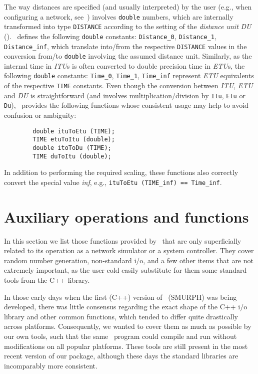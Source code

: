 The way distances are specified (and usually interpreted)
by the user (e.g., when configuring a network,
see~) involves {\tt double} numbers, which are internally
transformed into type {\tt DISTANCE} according to the setting of the
{\em distance unit\/} {\em DU\/} ().
\smurph\ defines the following {\tt double} constants:
{\tt Distance\_0},
{\tt Distance\_1},
{\tt Distance\_inf},
which translate into/from the respective {\tt DISTANCE} values in the
conversion from/to {\tt double} involving the assumed distance unit.
Similarly, as the internal time in {\em ITU\/}s is often converted to 
double precision time in {\em ETU\/}s, the following {\tt double} constants:
{\tt Time\_0},
{\tt Time\_1},
{\tt Time\_inf}
represent {\em ETU\/} equivalents of the respective {\tt TIME} constants.
Even though the conversion between {\em ITU}, {\em ETU\/} and {\em DU\/} is
straightforward (and involves multiplication/division by {\tt Itu}, {\tt Etu}
or {\tt Du}), \smurph\ provides the following functions whose consistent
usage may help to avoid confusion or ambiguity:
\begin{verbatim}
        double ituToEtu (TIME);
        TIME etuToItu (double);
        double itoToDu (TIME);
        TIME duToItu (double);
\end{verbatim}
\noindent
In addition to performing the required scaling, these functions also correctly
convert the special value {\em inf}, e.g.,
{\tt ituToEtu (TIME\_inf) == Time\_inf}.

\section{Auxiliary operations and functions}
\label{rm_au}

In this section we list those functions provided by \smurph\ that are
only superficially related
to its operation as a network simulator or a system controller.
They cover random number generation, non-standard i/o, and a few other
items that are not extremely important, as the user cold easily substitute
for them some standard tools from the C++ library.

In those early days
when the first (C++) version of \smurph\ ({\sc SMURPH}) was being developed,
there was little consensus regarding the exact shape of the C++ i/o library
and other common functions, which tended to differ
quite drastically across platforms.
Consequently, we wanted to cover them as much as possible by our own tools,
such that the same \smurph\ program could compile and run
without modifications on all popular platforms.
These tools are still present in the most recent version of our package,
although these days the standard libraries are incomparably more consistent.

